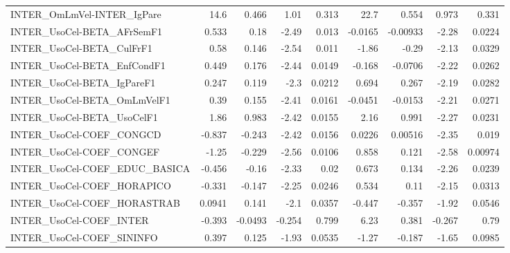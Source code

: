 \begin{tabular}{lrrrrrrrr}
INTER\_OmLmVel-INTER\_IgPare            &        14.6 &        0.466 &    1.01 &    0.313 &       22.7 &       0.554 &        0.973 &         0.331 \\
INTER\_UsoCel-BETA\_AFrSemF1            &       0.533 &         0.18 &   -2.49 &    0.013 &    -0.0165 &    -0.00933 &        -2.28 &        0.0224 \\
INTER\_UsoCel-BETA\_CulFrF1             &        0.58 &        0.146 &   -2.54 &    0.011 &      -1.86 &       -0.29 &        -2.13 &        0.0329 \\
INTER\_UsoCel-BETA\_EnfCondF1           &       0.449 &        0.176 &   -2.44 &   0.0149 &     -0.168 &     -0.0706 &        -2.22 &        0.0262 \\
INTER\_UsoCel-BETA\_IgPareF1            &       0.247 &        0.119 &    -2.3 &   0.0212 &      0.694 &       0.267 &        -2.19 &        0.0282 \\
INTER\_UsoCel-BETA\_OmLmVelF1           &        0.39 &        0.155 &   -2.41 &   0.0161 &    -0.0451 &     -0.0153 &        -2.21 &        0.0271 \\
INTER\_UsoCel-BETA\_UsoCelF1            &        1.86 &        0.983 &   -2.42 &   0.0155 &       2.16 &       0.991 &        -2.27 &        0.0231 \\
INTER\_UsoCel-COEF\_CONGCD              &      -0.837 &       -0.243 &   -2.42 &   0.0156 &     0.0226 &     0.00516 &        -2.35 &         0.019 \\
INTER\_UsoCel-COEF\_CONGEF              &       -1.25 &       -0.229 &   -2.56 &   0.0106 &      0.858 &       0.121 &        -2.58 &       0.00974 \\
INTER\_UsoCel-COEF\_EDUC\_BASICA         &      -0.456 &        -0.16 &   -2.33 &     0.02 &      0.673 &       0.134 &        -2.26 &        0.0239 \\
INTER\_UsoCel-COEF\_HORAPICO            &      -0.331 &       -0.147 &   -2.25 &   0.0246 &      0.534 &        0.11 &        -2.15 &        0.0313 \\
INTER\_UsoCel-COEF\_HORASTRAB           &      0.0941 &        0.141 &    -2.1 &   0.0357 &     -0.447 &      -0.357 &        -1.92 &        0.0546 \\
INTER\_UsoCel-COEF\_INTER               &      -0.393 &      -0.0493 &  -0.254 &    0.799 &       6.23 &       0.381 &       -0.267 &          0.79 \\
INTER\_UsoCel-COEF\_SININFO             &       0.397 &        0.125 &   -1.93 &   0.0535 &      -1.27 &      -0.187 &        -1.65 &        0.0985 \\

\end{tabular}
